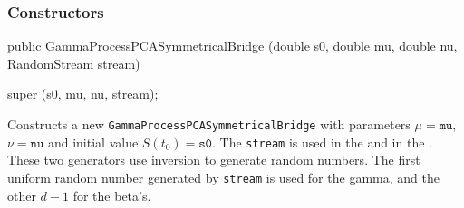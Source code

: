 \subsubsection* {Constructors}
\begin{code}

   public GammaProcessPCASymmetricalBridge (double s0, double mu, double nu,
                                            RandomStream stream) \begin{hide} {
        super (s0, mu, nu,  stream);
   }\end{hide}
\end{code}
\begin{tabb} 
Constructs a new \texttt{GammaProcessPCASymmetricalBridge} 
with parameters $\mu = \texttt{mu}$, $\nu = \texttt{nu}$ and initial 
value $S(t_{0}) = \texttt{s0}$.
The  \texttt{stream}
is used in the 
and in the .
These two generators use inversion to generate random numbers.  The first
uniform random number generated by \texttt{stream} is used for the gamma, and the 
other $d-1$ for the beta's.
\end{tabb}

